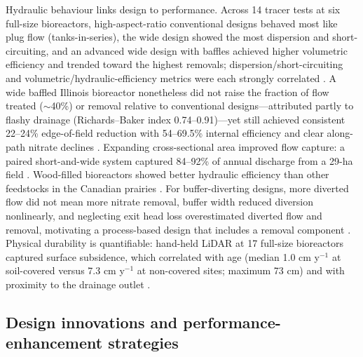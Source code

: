 Hydraulic behaviour links design to performance. Across 14 tracer tests at six full-size bioreactors, high-aspect-ratio conventional designs behaved most like plug flow (tanks-in-series), the wide design showed the most dispersion and short-circuiting, and an advanced wide design with baffles achieved higher volumetric efficiency and trended toward the highest removals; dispersion/short-circuiting and volumetric/hydraulic-efficiency metrics were each strongly correlated \parencite{deOliveira2023}. A wide baffled Illinois bioreactor nonetheless did not raise the fraction of flow treated ($\sim$40\%) or removal relative to conventional designs---attributed partly to flashy drainage (Richards--Baker index 0.74--0.91)---yet still achieved consistent 22--24\% edge-of-field reduction with 54--69.5\% internal efficiency and clear along-path nitrate declines \parencite{Dougherty2020b}. Expanding cross-sectional area improved flow capture: a paired short-and-wide system captured 84--92\% of annual discharge from a 29-ha field \parencite{Maxwell2022}. Wood-filled bioreactors showed better hydraulic efficiency than other feedstocks in the Canadian prairies \parencite{Kohn2023}. For buffer-diverting designs, more diverted flow did not mean more nitrate removal, buffer width reduced diversion nonlinearly, and neglecting exit head loss overestimated diverted flow and removal, motivating a process-based design that includes a removal component \parencite{Abdalaal2023}. Physical durability is quantifiable: hand-held LiDAR at 17 full-size bioreactors captured surface subsidence, which correlated with age (median 1.0 cm y$^{-1}$ at soil-covered versus 7.3 cm y$^{-1}$ at non-covered sites; maximum 73 cm) and with proximity to the drainage outlet \parencite{Christianson2025b}.

\subsection{Design innovations and performance-enhancement strategies}

